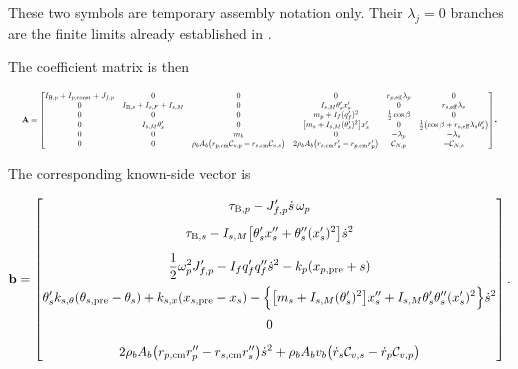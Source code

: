 \documentclass[11pt]{report}
\numberwithin{equation}{section}
\begin{document}
These two symbols are temporary assembly notation only. Their
\(\lambda_j=0\) branches are the finite limits already established in
.

The coefficient matrix is then

\begin{equation}
\resizebox{0.98\textwidth}{!}{$
\mathbf A
=
\begin{bmatrix}
I_{\mathrm B,p}+I_{p,\mathrm{const}}+J_{f,p}
&0
&0
&0
&r_{p,\mathrm{eff}}\lambda_p
&0
\\
0
&I_{\mathrm B,s}+I_{s,F}+I_{s,M}
&0
&I_{s,M}\theta_s'x_s'
&0
&r_{s,\mathrm{eff}}\lambda_s
\\
0
&0
&0
&m_p+I_f(q_f')^2
&\tfrac12\cos\beta
&0
\\
0
&I_{s,M}\theta_s'
&0
&\bigl[m_s+I_{s,M}(\theta_s')^2\bigr]x_s'
&0
&\tfrac12
 \bigl(
    \cos\beta+r_{s,\mathrm{eff}}\lambda_s\theta_s'
 \bigr)
\\
0
&0
&m_b
&0
&-\lambda_p
&-\lambda_s
\\
0
&0
&\rho_bA_b
 \bigl(
    r_{p,\mathrm{cm}}\mathcal C_{v,p}
    -
    r_{s,\mathrm{cm}}\mathcal C_{v,s}
 \bigr)
&2\rho_bA_b
 \bigl(
    r_{s,\mathrm{cm}}r_s'
    -
    r_{p,\mathrm{cm}}r_p'
 \bigr)
&\mathcal C_{N,p}
&-\mathcal C_{N,s}
\end{bmatrix}
$}.
\label{eq:engaged_mechanical_matrix}
\end{equation}

The corresponding known-side vector is

\begingroup
\small
\begin{equation}
\mathbf b
=
\begin{bmatrix}
\displaystyle
\tau_{\mathrm B,p}
-
J_{f,p}'\dot s\,\omega_p
\\[9pt]
\displaystyle
\tau_{\mathrm B,s}
-
I_{s,M}
\bigl[
    \theta_s'x_s''
    +
    \theta_s''(x_s')^2
\bigr]\dot s^2
\\[9pt]
\displaystyle
\frac12\omega_p^2J_{f,p}'
-
I_fq_f'q_f''\dot s^2
-
k_p(x_{p,\mathrm{pre}}+s)
\\[9pt]
\displaystyle
\theta_s'k_{s,\theta}
(\theta_{s,\mathrm{pre}}-\theta_s)
+
k_{s,x}(x_{s,\mathrm{pre}}-x_s)
-
\Bigl\{
    \bigl[m_s+I_{s,M}(\theta_s')^2\bigr]x_s''
    +
    I_{s,M}\theta_s'\theta_s''(x_s')^2
\Bigr\}\dot s^2
\\[9pt]
0
\\[9pt]
\displaystyle
2\rho_bA_b
\bigl(
    r_{p,\mathrm{cm}}r_p''
    -
    r_{s,\mathrm{cm}}r_s''
\bigr)\dot s^2
+
\rho_bA_bv_b
\bigl(
    \dot r_s\mathcal C_{v,s}
    -
    \dot r_p\mathcal C_{v,p}
\bigr)
\end{bmatrix}.
\label{eq:engaged_mechanical_rhs}
\end{equation}
\endgroup
\end{document}
